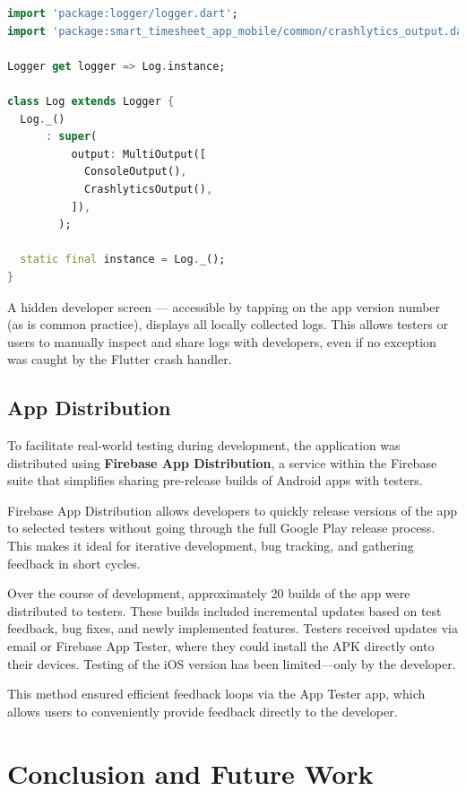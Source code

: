 \documentclass[
  digital,     %
  oneside,     %
  nosansbold,  %
  nocolorbold, %
  lof,         %
  lot,         %
]{fithesis4}
\begin{document}
\begin{lstlisting}[language=Dart, caption={Logger setup with custom Crashlytics output}, label={lst:logger_setup}, floatplacement=H, showstringspaces=false]
import 'package:logger/logger.dart';
import 'package:smart_timesheet_app_mobile/common/crashlytics_output.dart';

Logger get logger => Log.instance;

class Log extends Logger {
  Log._()
      : super(
          output: MultiOutput([
            ConsoleOutput(),
            CrashlyticsOutput(),
          ]),
        );

  static final instance = Log._();
}
\end{lstlisting}

A hidden developer screen --- accessible by tapping on the app version number (as is common practice), displays all locally collected logs. This allows testers or users to manually inspect and share logs with developers, even if no exception was caught by the Flutter crash handler.

\section{App Distribution}

To facilitate real-world testing during development, the application was distributed using \textbf{Firebase App Distribution}, a service within the Firebase suite that simplifies sharing pre-release builds of Android apps with testers.

Firebase App Distribution allows developers to quickly release versions of the app to selected testers without going through the full Google Play release process. This makes it ideal for iterative development, bug tracking, and gathering feedback in short cycles.

Over the course of development, approximately 20 builds of the app were distributed to testers. These builds included incremental updates based on test feedback, bug fixes, and newly implemented features. Testers received updates via email or Firebase App Tester, where they could install the \gls{APK} directly onto their devices. Testing of the \gls{iOS} version has been limited—only by the developer.

This method ensured efficient feedback loops via the App Tester app, which allows users to conveniently provide feedback directly to the developer.

\chapter{Conclusion and Future Work}
\end{document}
